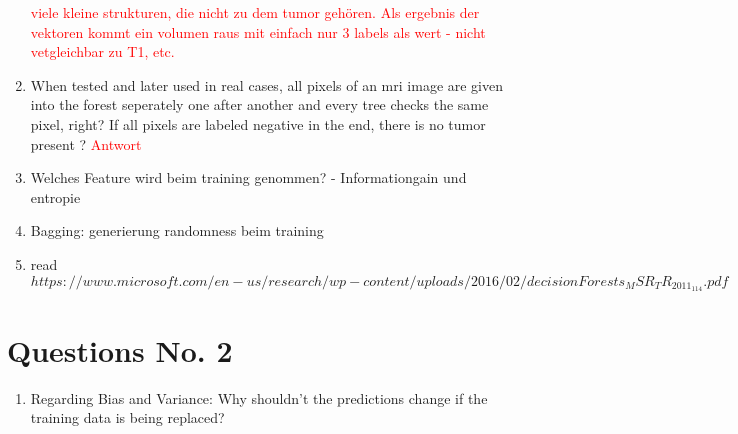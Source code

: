 \documentclass{article}
\begin{document}
\begin{enumerate}
        \textcolor{red}{viele kleine strukturen, die nicht zu dem tumor gehören. Als ergebnis der vektoren kommt ein volumen raus mit einfach nur 3 labels als wert - nicht vetgleichbar zu T1, etc. }
     \item When tested and later used in real cases, all pixels of an mri image are given into the forest seperately one after another and every tree checks the same pixel, right? If all pixels are labeled negative in the end, there is no tumor present ? 
        \textcolor{red}{Antwort}
    \item Welches Feature wird beim training genommen? - Informationgain und entropie
    \item Bagging: generierung randomness beim training 
    \item read $https://www.microsoft.com/en-us/research/wp-content/uploads/2016/02/decisionForests_MSR_TR_2011_114.pdf$
    \end{enumerate}



    \newpage

    \section{Questions No. 2}
    \begin{enumerate}
       \item Regarding Bias and Variance: Why shouldn't the predictions change if the training data is being replaced? 
    \end{enumerate}
\end{document}
